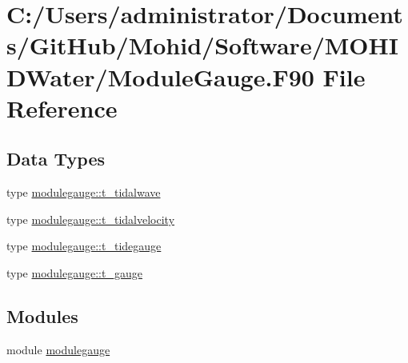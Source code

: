 \hypertarget{_module_gauge_8_f90}{}\section{C\+:/\+Users/administrator/\+Documents/\+Git\+Hub/\+Mohid/\+Software/\+M\+O\+H\+I\+D\+Water/\+Module\+Gauge.F90 File Reference}
\label{_module_gauge_8_f90}
\subsection*{Data Types}
\begin{DoxyCompactItemize}
\item 
type \mbox{\hyperlink{structmodulegauge_1_1t__tidalwave}{modulegauge\+::t\+\_\+tidalwave}}
\item 
type \mbox{\hyperlink{structmodulegauge_1_1t__tidalvelocity}{modulegauge\+::t\+\_\+tidalvelocity}}
\item 
type \mbox{\hyperlink{structmodulegauge_1_1t__tidegauge}{modulegauge\+::t\+\_\+tidegauge}}
\item 
type \mbox{\hyperlink{structmodulegauge_1_1t__gauge}{modulegauge\+::t\+\_\+gauge}}
\end{DoxyCompactItemize}
\subsection*{Modules}
\begin{DoxyCompactItemize}
\item 
module \mbox{\hyperlink{namespacemodulegauge}{modulegauge}}
\end{DoxyCompactItemize}
